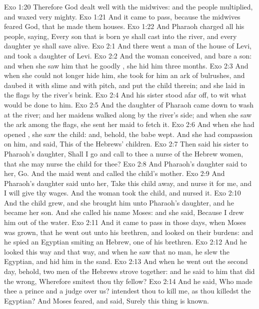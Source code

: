 \vs Exo 1:20 Therefore God dealt well with the midwives: and the people multiplied, and waxed very mighty.
\vs Exo 1:21 And it came to pass, because the midwives feared God, that he made them houses.
\vs Exo 1:22 And Pharaoh charged all his people, saying, Every son that is born ye shall cast into the river, and every daughter ye shall save alive.
\vs Exo 2:1 And there went a man of the house of Levi, and took  a daughter of Levi.
\vs Exo 2:2 And the woman conceived, and bare a son: and when she saw him that he  goodly , she hid him three months.
\vs Exo 2:3 And when she could not longer hide him, she took for him an ark of bulrushes, and daubed it with slime and with pitch, and put the child therein; and she laid  in the flags by the river's brink.
\vs Exo 2:4 And his sister stood afar off, to wit what would be done to him.
\vs Exo 2:5 And the daughter of Pharaoh came down to wash  at the river; and her maidens walked along by the river's side; and when she saw the ark among the flags, she sent her maid to fetch it.
\vs Exo 2:6 And when she had opened , she saw the child: and, behold, the babe wept. And she had compassion on him, and said, This  of the Hebrews' children.
\vs Exo 2:7 Then said his sister to Pharaoh's daughter, Shall I go and call to thee a nurse of the Hebrew women, that she may nurse the child for thee?
\vs Exo 2:8 And Pharaoh's daughter said to her, Go. And the maid went and called the child's mother.
\vs Exo 2:9 And Pharaoh's daughter said unto her, Take this child away, and nurse it for me, and I will give  thy wages. And the woman took the child, and nursed it.
\vs Exo 2:10 And the child grew, and she brought him unto Pharaoh's daughter, and he became her son. And she called his name Moses: and she said, Because I drew him out of the water.
\vs Exo 2:11 And it came to pass in those days, when Moses was grown, that he went out unto his brethren, and looked on their burdens: and he spied an Egyptian smiting an Hebrew, one of his brethren.
\vs Exo 2:12 And he looked this way and that way, and when he saw that  no man, he slew the Egyptian, and hid him in the sand.
\vs Exo 2:13 And when he went out the second day, behold, two men of the Hebrews strove together: and he said to him that did the wrong, Wherefore smitest thou thy fellow?
\vs Exo 2:14 And he said, Who made thee a prince and a judge over us? intendest thou to kill me, as thou killedst the Egyptian? And Moses feared, and said, Surely this thing is known.

